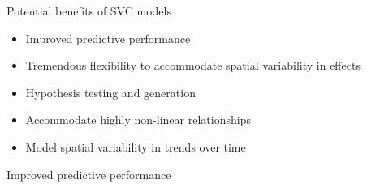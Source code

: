 \begin{frame}{Potential benefits of SVC models}
    \begin{itemize}
         \item Improved predictive performance
         \item Tremendous flexibility to accommodate spatial variability in effects
         \item Hypothesis testing and generation
         \item Accommodate highly non-linear relationships
	 \item Model spatial variability in trends over time
    \end{itemize}

\end{frame}

\begin{frame}{Improved predictive performance}
\begin{figure}[]
\begin{center}
\vskip -5mm
\\  \vskip-2.5mm
\\
\end{center}
\label{fig:bio-coefs}
\end{figure}


\end{frame}
	
